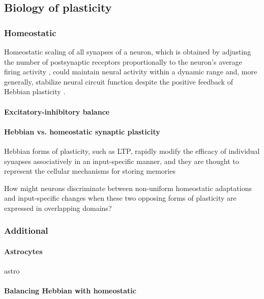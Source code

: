 \documentclass{article}
\theoremstyle{definition} \newtheorem{definition}{Definition}
\theoremstyle{remark} \newtheorem{remark}{Remark}
\newcounter{ct}
\begin{document}
\subsection{Biology of plasticity}

\subsubsection{Homeostatic} \citep{turrigiano2004homeostatic}

Homeostatic scaling of all synapses of a neuron, which is obtained by adjusting the number of postsynaptic receptors proportionally to the neuron’s average firing activity \citep{turrigiano1998activity,turrigiano1999homeostatic},
 could maintain neural activity within a dynamic range and, more generally, stabilize neural circuit function despite the positive feedback of Hebbian plasticity \citep{toyoizumi2014modeling}. 
 
 \paragraph{Excitatory-inhibitory balance}
 
 
\paragraph{Hebbian vs. homeostatic synaptic plasticity}
\citep{pozo2010unraveling}
Hebbian forms of plasticity, such as LTP, rapidly modify the efficacy of individual synapses associatively in an input-specific manner, and they are thought to represent the cellular mechanisms for storing memories

How might neurons discriminate between non-uniform homeostatic adaptations and input-specific changes when these two opposing forms of plasticity are expressed in overlapping domains? \citep{rabinowitch2006interplay, rabinowitch2008two}
 
 
\subsubsection{Additional}
\paragraph{Astrocytes} 
astro\citep{depitta2016astrocytes}
\citep{koshkin2024astrocyte}

\paragraph{Balancing Hebbian with homeostatic}
\citep{zenke2017temporal}
\end{document}
